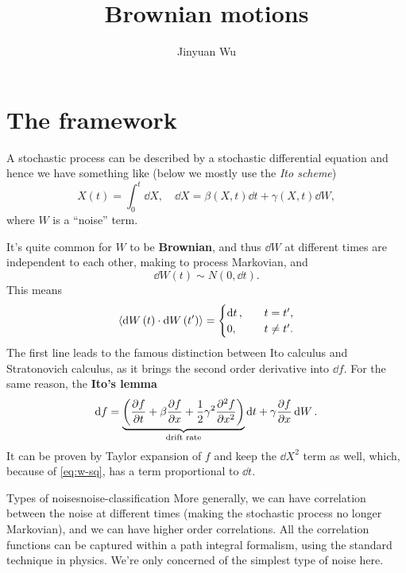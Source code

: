 \documentclass[hyperref, a4paper]{article}
\title{Brownian motions}
\author{Jinyuan Wu}
\newcommand*{\concept}[1]{{\textbf{#1}}}
\begin{document}
\maketitle

\section{The framework}

A stochastic process can be described by a stochastic differential equation
and hence we have something like (below we mostly use the \emph{Ito scheme})
\begin{equation}
    X(t) = \int_{0}^{t} \dd{X}, \quad 
    \dd{X} = \beta(X, t) \dd{t} + \gamma(X, t) \dd{W},
\end{equation}
where $W$ is a ``noise'' term.

It's quite common for $W$ to be \concept{Brownian},
and thus $\dd{W}$ at different times are independent to each other,
making to process Markovian,
and 
\begin{equation}
    \dd{W}(t) \sim N(0, \dd{t}).
\end{equation}
This means 
\begin{equation}
    \expval{\dd{W}(t) \cdot \dd{W}(t')} = \begin{cases}
        \dd{t}, &\quad t = t',\\
        0,      &\quad t \neq t'.
    \end{cases}
    \label{eq:w-sq}
\end{equation}
The first line leads to the famous distinction between Ito calculus and Stratonovich calculus,
as it brings the second order derivative into $\dd{f}$.
For the same reason, the \concept{Ito's lemma} 
\begin{equation}
    \dd{f} = \underbrace{\left(
        \pdv{f}{t} + \beta \pdv{f}{x} + \frac{1}{2} \gamma^2 \pdv[2]{f}{x} 
    \right)}_{\text{drift rate}} \dd{t} 
    + \gamma \pdv{f}{x} \dd{W}.
\end{equation}
It can be proven by Taylor expansion of $f$ and keep the $\dd{X}^2$ term as well,
which, because of \eqref{eq:w-sq}, has a term proportional to $\dd{t}$.

\begin{theorybox}{Types of noises}{noise-classification}
    More generally, we can have correlation between the noise at different times (making the stochastic process no longer Markovian),
    and we can have higher order correlations.
    All the correlation functions can be captured within a path integral formalism,
    using the standard technique in physics.
    We're only concerned of the simplest type of noise here.
\end{theorybox}
\end{document}
